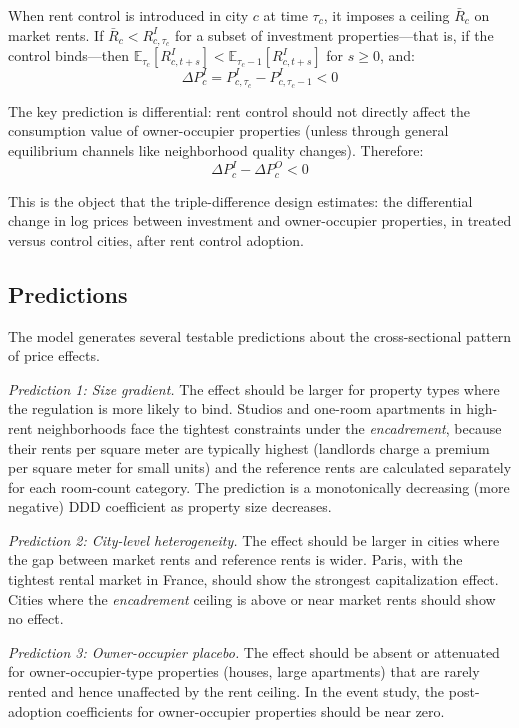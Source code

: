 \documentclass[12pt]{article}
\newcommand{\E}{\mathbb{E}}
\begin{document}
When rent control is introduced in city $c$ at time $\tau_c$, it imposes a ceiling $\bar{R}_{c}$ on market rents. If $\bar{R}_c < R^I_{c,\tau_c}$ for a subset of investment properties---that is, if the control binds---then $\E_{\tau_c}[R^I_{c,t+s}] < \E_{\tau_c-1}[R^I_{c,t+s}]$ for $s \geq 0$, and:
\begin{equation}
\Delta P^I_c = P^I_{c,\tau_c} - P^I_{c,\tau_c-1} < 0
\label{eq:cap_invest}
\end{equation}

The key prediction is differential: rent control should not directly affect the consumption value of owner-occupier properties (unless through general equilibrium channels like neighborhood quality changes). Therefore:
\begin{equation}
\Delta P^I_c - \Delta P^O_c < 0
\label{eq:prediction}
\end{equation}

This is the object that the triple-difference design estimates: the differential change in log prices between investment and owner-occupier properties, in treated versus control cities, after rent control adoption.

\subsection{Predictions}

The model generates several testable predictions about the cross-sectional pattern of price effects.

\emph{Prediction 1: Size gradient.} The effect should be larger for property types where the regulation is more likely to bind. Studios and one-room apartments in high-rent neighborhoods face the tightest constraints under the \emph{encadrement}, because their rents per square meter are typically highest (landlords charge a premium per square meter for small units) and the reference rents are calculated separately for each room-count category. The prediction is a monotonically decreasing (more negative) DDD coefficient as property size decreases.

\emph{Prediction 2: City-level heterogeneity.} The effect should be larger in cities where the gap between market rents and reference rents is wider. Paris, with the tightest rental market in France, should show the strongest capitalization effect. Cities where the \emph{encadrement} ceiling is above or near market rents should show no effect.

\emph{Prediction 3: Owner-occupier placebo.} The effect should be absent or attenuated for owner-occupier-type properties (houses, large apartments) that are rarely rented and hence unaffected by the rent ceiling. In the event study, the post-adoption coefficients for owner-occupier properties should be near zero.
\end{document}
